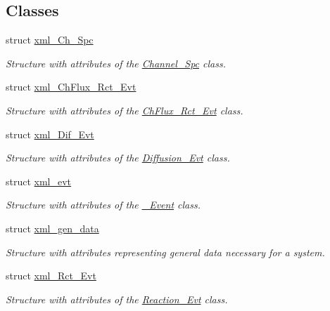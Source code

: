 \subsection*{Classes}
\begin{DoxyCompactItemize}
\item 
struct \hyperlink{structnw_1_1_standard___ipt_1_1xml___ch___spc}{xml\+\_\+\+Ch\+\_\+\+Spc}
\begin{DoxyCompactList}\small\item\em Structure with attributes of the \hyperlink{classnw_1_1_channel___spc}{Channel\+\_\+\+Spc} class. \end{DoxyCompactList}\item 
struct \hyperlink{structnw_1_1_standard___ipt_1_1xml___ch_flux___rct___evt}{xml\+\_\+\+Ch\+Flux\+\_\+\+Rct\+\_\+\+Evt}
\begin{DoxyCompactList}\small\item\em Structure with attributes of the \hyperlink{classnw_1_1_ch_flux___rct___evt}{Ch\+Flux\+\_\+\+Rct\+\_\+\+Evt} class. \end{DoxyCompactList}\item 
struct \hyperlink{structnw_1_1_standard___ipt_1_1xml___dif___evt}{xml\+\_\+\+Dif\+\_\+\+Evt}
\begin{DoxyCompactList}\small\item\em Structure with attributes of the \hyperlink{classnw_1_1_diffusion___evt}{Diffusion\+\_\+\+Evt} class. \end{DoxyCompactList}\item 
struct \hyperlink{structnw_1_1_standard___ipt_1_1xml__evt}{xml\+\_\+evt}
\begin{DoxyCompactList}\small\item\em Structure with attributes of the \hyperlink{classnw_1_1___event}{\+\_\+\+Event} class. \end{DoxyCompactList}\item 
struct \hyperlink{structnw_1_1_standard___ipt_1_1xml__gen__data}{xml\+\_\+gen\+\_\+data}
\begin{DoxyCompactList}\small\item\em Structure with attributes representing general data necessary for a system. \end{DoxyCompactList}\item 
struct \hyperlink{structnw_1_1_standard___ipt_1_1xml___rct___evt}{xml\+\_\+\+Rct\+\_\+\+Evt}
\begin{DoxyCompactList}\small\item\em Structure with attributes of the \hyperlink{classnw_1_1_reaction___evt}{Reaction\+\_\+\+Evt} class. \end{DoxyCompactList}\item 

\end{DoxyCompactItemize}
